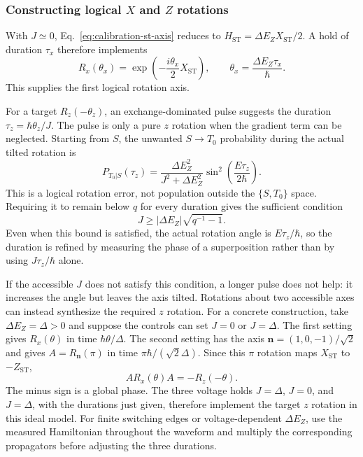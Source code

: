 \subsubsection{Constructing logical \texorpdfstring{$X$}{X} and
\texorpdfstring{$Z$}{Z} rotations}

With $J\simeq0$, Eq.~\eqref{eq:calibration-st-axis} reduces to
$H_{\mathrm{ST}}=\Delta E_ZX_{\mathrm{ST}}/2$. A hold of duration
$\tau_x$ therefore implements
\begin{equation}
 R_x(\theta_x)
 =\exp\!\left(-\frac{i\theta_x}{2}X_{\mathrm{ST}}\right),
 \qquad
 \theta_x=\frac{\Delta E_Z\tau_x}{\hbar}.
 \label{eq:calibration-st-x-rotation}
\end{equation}
This supplies the first logical rotation axis.

For a target $R_z(-\theta_z)$, an exchange-dominated pulse suggests
the duration $\tau_z=\hbar\theta_z/J$. The pulse is only a pure
$z$ rotation when the gradient term can be neglected. Starting from
$S$, the unwanted $S\rightarrow T_0$ probability during the actual
tilted rotation is
\begin{equation}
 P_{T_0|S}(\tau_z)=
 \frac{\Delta E_Z^2}{J^2+\Delta E_Z^2}
 \sin^2\!\left(\frac{E\tau_z}{2\hbar}\right).
 \label{eq:calibration-st-axis-leakage}
\end{equation}
This is a logical rotation error, not population outside the
$\{S,T_0\}$ space. Requiring it to remain below $q$ for every
duration gives the sufficient condition
\[
 J\geq |\Delta E_Z|\sqrt{q^{-1}-1}.
\]
Even when this bound is satisfied, the actual rotation angle is
$E\tau_z/\hbar$, so the duration is refined by measuring the phase
of a superposition rather than by using $J\tau_z/\hbar$ alone.

If the accessible $J$ does not satisfy this condition, a longer
pulse does not help: it increases the angle but leaves the axis
tilted. Rotations about two accessible axes can instead synthesize
the required $z$ rotation. For a concrete construction, take
$\Delta E_Z=\Delta>0$ and suppose the controls can set $J=0$ or
$J=\Delta$. The first setting gives $R_x(\theta)$ in time
$\hbar\theta/\Delta$. The second setting has the axis
$\mathbf n=(1,0,-1)/\sqrt2$ and gives
$A=R_{\mathbf n}(\pi)$ in time
$\pi\hbar/(\sqrt2\Delta)$. Since this $\pi$ rotation maps
$X_{\mathrm{ST}}$ to $-Z_{\mathrm{ST}}$,
\begin{equation}
 A R_x(\theta)A=-R_z(-\theta).
 \label{eq:calibration-st-composite-z}
\end{equation}
The minus sign is a global phase. The three voltage holds
$J=\Delta$, $J=0$, and $J=\Delta$, with the durations just given,
therefore implement the target $z$ rotation in this ideal model.
For finite switching edges or voltage-dependent $\Delta E_Z$, use
the measured Hamiltonian throughout the waveform and multiply the
corresponding propagators before adjusting the three durations.

